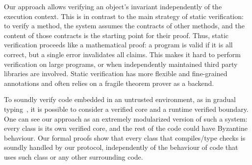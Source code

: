 



\newcommand\sepItems{\saveSpace\saveSpace\saveSpace\\*${}_{}$\\*${}_{}\,\bullet\,$}
%
{}
Our approach allows verifying an object's invariant independently of the execution context.
This is in contrast to the main strategy of static verification: to verify a method, the system assumes the contracts of other methods, and the content of those contracts is the starting point for their proof.
Thus, static verification proceeds like a mathematical proof: a program is valid if it is all correct, but a single error invalidates all claims. This makes it hard to perform verification on large programs, or when independently maintained third party libraries are involved.
 Static verification has more flexible and fine-grained annotations and often relies on a fragile theorem prover as a backend.

To soundly verify code embedded in an untrusted environment, as in gradual typing~\cite{DBLP:conf/oopsla/TakikawaSDTF12,DBLP:conf/popl/WrigstadNLOV10}, it is possible to 
consider a verified core and a runtime verified boundary.
One can see our approach as an extremely modularized	version of such a system: every class is its
own verified core, and the rest of the code could have Byzantine behaviour. Our formal proofs show that every class that compiles/type checks is 
soundly handled by our protocol, independently of the behaviour of code that uses such class or any other surrounding code.

